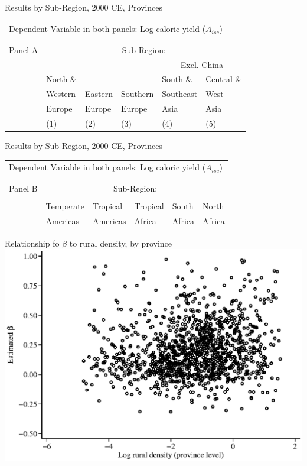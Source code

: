 \documentclass[10pt, xcolor=dvipsnames]{beamer}
\begin{document}
\begin{frame}{Results by Sub-Region, 2000 CE, Provinces}

{\scriptsize
\begin{tabularx}{\textwidth}{lXXXXX}
\midrule
\multicolumn{6}{l}{Dependent Variable in both panels: Log caloric yield ($A_{isc}$)} \\ \\
\\
Panel A & \multicolumn{5}{c}{Sub-Region:} \\ \cmidrule{2-6}
 &          &         &             &  \multicolumn{2}{c}{Excl. China} \\ \cmidrule(lr){5-6}
 & North \& &         &              & South \&  & Central \&             \\
 & Western  & Eastern & Southern     & Southeast & West        \\
 & Europe   & Europe  & Europe       & Asia      & Asia      \\
 & (1) & (2) & (3) & (4) & (5) \\
\midrule

\midrule
\end{tabularx}
}

\hfill \hyperlink{robustness}{}
\end{frame}

\begin{frame}{Results by Sub-Region, 2000 CE, Provinces}

{\scriptsize
\begin{tabularx}{\textwidth}{lXXXXX}
\midrule
\multicolumn{6}{l}{Dependent Variable in both panels: Log caloric yield ($A_{isc}$)} \\ \\
\\
Panel B & \multicolumn{5}{c}{Sub-Region:} \\ \cmidrule{2-6}
 &           &   &           &          &             \\
 & Temperate & Tropical  & Tropical & South    & North    \\
 & Americas  & Americas  & Africa   & Africa   & Africa     \\
\midrule

\midrule
\end{tabularx}
}

\hfill \hyperlink{robustness}{}
\end{frame}

\begin{frame}{Relationship fo $\beta$ to rural density, by province}\label{rurdbeta}
\includegraphics[width=.8\textwidth]{fig_beta_rurd.eps}
\hfill \hyperlink{eos}{}
\end{frame}
\end{document}
